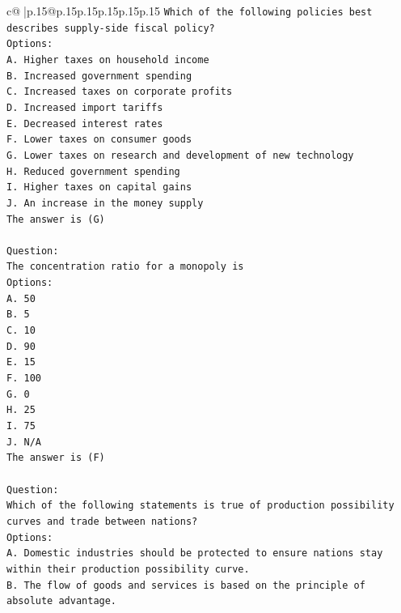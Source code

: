 \documentclass{article}
\begin{document}
{\begin{supertabular}{c@{$\;$}|p{.15\linewidth}@{}p{.15\linewidth}p{.15\linewidth}p{.15\linewidth}p{.15\linewidth}p{.15\linewidth}}
{{{\texttt{Which of the following policies best describes supply{-}side fiscal policy?} \\
\texttt{Options:} \\
\texttt{A. Higher taxes on household income} \\
\texttt{B. Increased government spending} \\
\texttt{C. Increased taxes on corporate profits} \\
\texttt{D. Increased import tariffs} \\
\texttt{E. Decreased interest rates} \\
\texttt{F. Lower taxes on consumer goods} \\
\texttt{G. Lower taxes on research and development of new technology} \\
\texttt{H. Reduced government spending} \\
\texttt{I. Higher taxes on capital gains} \\
\texttt{J. An increase in the money supply} \\
\texttt{The answer is (G)} \\
\\ 
\texttt{Question:} \\
\texttt{The concentration ratio for a monopoly is} \\
\texttt{Options:} \\
\texttt{A. 50} \\
\texttt{B. 5} \\
\texttt{C. 10} \\
\texttt{D. 90} \\
\texttt{E. 15} \\
\texttt{F. 100} \\
\texttt{G. 0} \\
\texttt{H. 25} \\
\texttt{I. 75} \\
\texttt{J. N/A} \\
\texttt{The answer is (F)} \\
\\ 
\texttt{Question:} \\
\texttt{Which of the following statements is true of production possibility curves and trade between nations?} \\
\texttt{Options:} \\
\texttt{A. Domestic industries should be protected to ensure nations stay within their production possibility curve.} \\
\texttt{B. The flow of goods and services is based on the principle of absolute advantage.} \\
}}}
\end{supertabular}}
\end{document}
